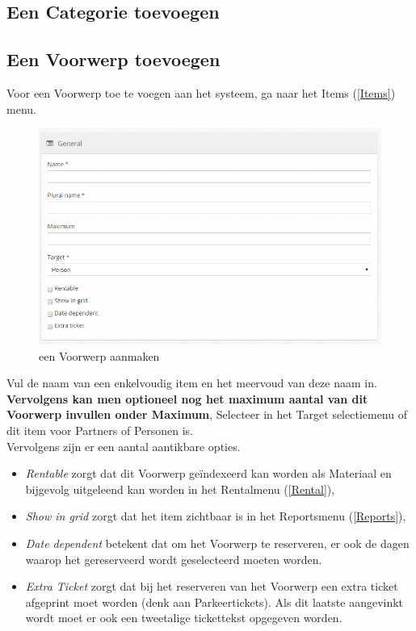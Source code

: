 \documentclass[]{memoir}
\begin{document}
\subsection{Een Categorie toevoegen} \label{SetCategory}
\subsection{Een Voorwerp toevoegen} \label{SetItem}
Voor een Voorwerp toe te voegen aan het systeem, ga naar het Items (\ref{Items}) menu. \\
\begin{figure}[H]
	\includegraphics[width=\linewidth]{addItem_left}
	\caption{een Voorwerp aanmaken}
\end{figure}
Vul de naam van een enkelvoudig item en het meervoud van deze naam in.
\textbf{Vervolgens kan men optioneel nog het maximum aantal van dit Voorwerp invullen onder Maximum}, 
Selecteer in het Target selectiemenu of dit item voor Partners of Personen is. \\
Vervolgens zijn er een aantal aantikbare opties.
\begin{itemize}
	\item \textsl{Rentable} zorgt dat dit Voorwerp geïndexeerd kan worden als Materiaal en bijgevolg uitgeleend kan worden in het Rentalmenu (\ref{Rental}), 
	\item \textsl{Show in grid} zorgt dat het item zichtbaar is in het Reportsmenu (\ref{Reports}), 
	\item \textsl{Date dependent} betekent dat om het Voorwerp te reserveren, er ook de dagen waarop het gereserveerd wordt geselecteerd moeten worden.
	\item \textsl{Extra Ticket} zorgt dat bij het reserveren van het Voorwerp een extra ticket afgeprint moet worden (denk aan Parkeertickets). Als dit laatste aangevinkt wordt moet er ook een tweetalige tickettekst opgegeven worden.
\end{itemize} 
\end{document}
